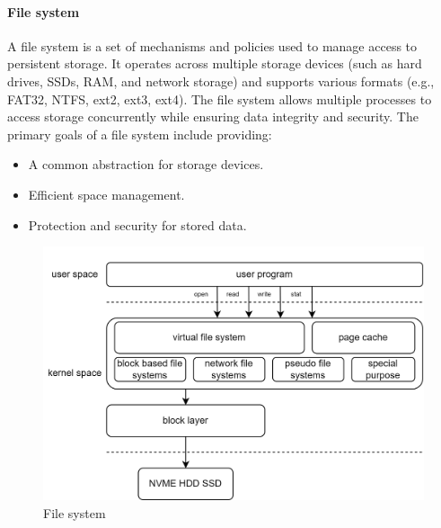 \paragraph*{File system}
A file system is a set of mechanisms and policies used to manage access to persistent storage. 
It operates across multiple storage devices (such as hard drives, SSDs, RAM, and network storage) and supports various formats (e.g., FAT32, NTFS, ext2, ext3, ext4). 
The file system allows multiple processes to access storage concurrently while ensuring data integrity and security.
The primary goals of a file system include providing:
\begin{itemize}
    \item A common abstraction for storage devices.
    \item Efficient space management.
    \item Protection and security for stored data.
\end{itemize}

\begin{figure}[H]
    \centering
    \includegraphics[width=0.75\linewidth]{images/fs.png}
    \caption{File system}
\end{figure}

